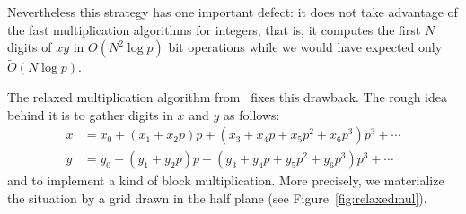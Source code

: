 \documentclass[11pt]{article}
\numberwithin{equation}{section}
\numberwithin{figure}{section}
\theoremstyle{definition}
\newcommand{\softO}{\tilde O}
\begin{document}
\noindent
Nevertheless this strategy has one important defect: it does not take 
advantage of the fast multiplication algorithms for integers, that is, it 
computes the first $N$ digits of $xy$ in $O(N^2 \log p)$ 
bit operations while we would have expected only $\softO(N \log p)$.

\medskip

The relaxed multiplication algorithm from~\cite{BeHoLe11} fixes this drawback. The 
rough idea behind it is to gather digits in $x$ and $y$ as follows:
\begin{align*}
x & = x_0 + (x_1 + x_2 p) p + (x_3 + x_4 p + x_5 p^2 + x_6 p^3) p^3 + \cdots \\
y & = y_0 + (y_1 + y_2 p) p + (y_3 + y_4 p + y_5 p^2 + y_6 p^3) p^3 + \cdots
\end{align*}
and to implement a kind of block multiplication. More precisely, we 
materialize the situation by a grid drawn in the half plane (see 
Figure~\ref{fig:relaxedmul}).
%
\end{document}
